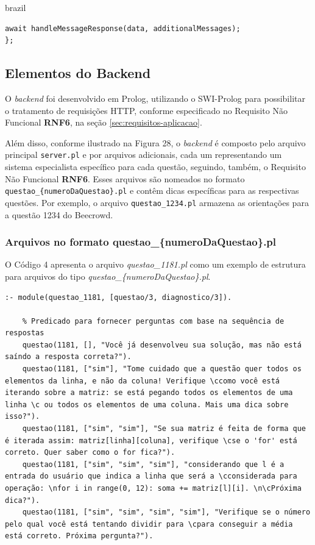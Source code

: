 \begin{otherlanguage*}{brazil}
\begin{lstlisting}[style=ufscthesisx_style, caption={Funções assíncronas para requisição HTTP}]
    await handleMessageResponse(data, additionalMessages);
};
\end{lstlisting}

\subsection{Elementos do Backend}

O \textit{backend} foi desenvolvido em Prolog, utilizando o SWI-Prolog para possibilitar o tratamento de requisições HTTP, conforme especificado no Requisito Não Funcional \textbf{RNF6}, na seção \ref{sec:requisitos-aplicacao}. 

Além disso, conforme ilustrado na Figura 28, o \textit{backend} é composto pelo arquivo principal \texttt{server.pl} e por arquivos adicionais, cada um representando um sistema especialista específico para cada questão, seguindo, também, o Requisito Não Funcional \textbf{RNF6}. Esses arquivos são nomeados no formato \texttt{questao\_\{numeroDaQuestao\}.pl} e contêm dicas específicas para as respectivas questões. Por exemplo, o arquivo \texttt{questao\_1234.pl} armazena as orientações para a questão 1234 do Beecrowd.

\subsubsection{Arquivos no formato questao\_\{numeroDaQuestao\}.pl}

O Código 4 apresenta o arquivo \textit{questao\_1181.pl} como um exemplo de estrutura para arquivos do tipo \textit{questao\_\{numeroDaQuestao\}.pl}.

\begin{lstlisting}[style=ufscthesisx_style, caption={Arquivo \textit{questao\_1181.pl}}]
    :- module(questao_1181, [questao/3, diagnostico/3]).
    
    % Predicado para fornecer perguntas com base na sequência de respostas
    questao(1181, [], "Você já desenvolveu sua solução, mas não está saíndo a resposta correta?").
    questao(1181, ["sim"], "Tome cuidado que a questão quer todos os elementos da linha, e não da coluna! Verifique \ccomo você está iterando sobre a matriz: se está pegando todos os elementos de uma linha \c ou todos os elementos de uma coluna. Mais uma dica sobre isso?").
    questao(1181, ["sim", "sim"], "Se sua matriz é feita de forma que é iterada assim: matriz[linha][coluna], verifique \cse o 'for' está correto. Quer saber como o for fica?").
    questao(1181, ["sim", "sim", "sim"], "considerando que l é a entrada do usuário que indica a linha que será a \cconsiderada para operação: \nfor i in range(0, 12): soma += matriz[l][i]. \n\cPróxima dica?").
    questao(1181, ["sim", "sim", "sim", "sim"], "Verifique se o número pelo qual você está tentando dividir para \cpara conseguir a média está correto. Próxima pergunta?").
    

\end{lstlisting}
\end{otherlanguage*}
